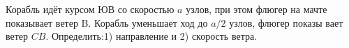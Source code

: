 Корабль идёт курсом ЮВ со скоростью $a$ узлов, при этом флюгер на мачте
показывает ветер B. Корабль уменьшает ход до $a/2$ узлов, флюгер показы
вает ветер $CB$. Определить:1) направление и 2) скорость ветра.
